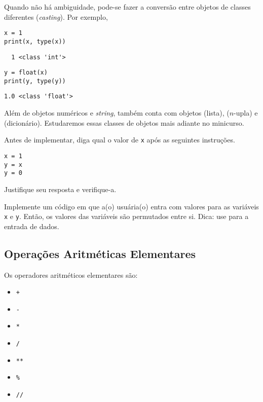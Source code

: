 \documentclass[a4paper,10pt,twoside]{article}
\begin{document}
\begin{obs}
  Quando não há ambiguidade, pode-se fazer a conversão entre objetos de classes diferentes (\textit{casting}). Por exemplo,

\begin{lstlisting}
x = 1
print(x, type(x))
\end{lstlisting}

\begin{verbatim}
  1 <class 'int'>
\end{verbatim}

\begin{lstlisting}
y = float(x)
print(y, type(y))
\end{lstlisting}

\begin{verbatim}
1.0 <class 'float'>  
\end{verbatim}

\end{obs}

Além de objetos numéricos e {\it string}, {\python} também conta com objetos {\PYTHONlist} (lista), {\PYTHONtuple} ($n$-upla) e {\PYTHONdict} (dicionário). Estudaremos essas classes de objetos mais adiante no minicurso.

\begin{exr}
  Antes de implementar, diga qual o valor de \texttt{x} após as seguintes instruções.

\begin{lstlisting}
x = 1
y = x
y = 0
\end{lstlisting}

Justifique seu resposta e verifique-a.
\end{exr}

\begin{exr}
  Implemente um código em que a(o) usuária(o) entra com valores para as variáveis \texttt{x} e \texttt{y}. Então, os valores das variáveis são permutados entre si. Dica: use {\PYTHONinput} para a entrada de dados.
\end{exr}

\subsection{Operações Aritméticas Elementares}

Os operadores aritméticos elementares são:
\begin{itemize}
\item[] \texttt{+} 
\item[] \texttt{-} 
\item[] \texttt{*} 
\item[] \texttt{/} 
\item[] \texttt{**} 
\item[] \texttt{\%} 
\item[] \texttt{//} 
\end{itemize}
\end{document}
